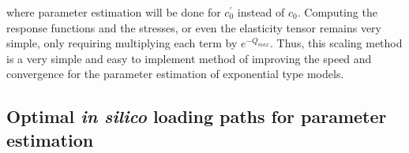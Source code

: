 where parameter estimation will be done for $c_0^\prime$ instead of $c_0$. Computing the response functions and the stresses, or even the elasticity tensor remains very simple, only requiring multiplying each term by $e^{-Q_{max}}$. Thus, this scaling method is a very simple and easy to implement method of improving the speed and convergence for the parameter estimation of exponential type models. 












\subsection{Optimal \textit{in silico} loading paths for parameter estimation}\label{sec:optimaldesign}

